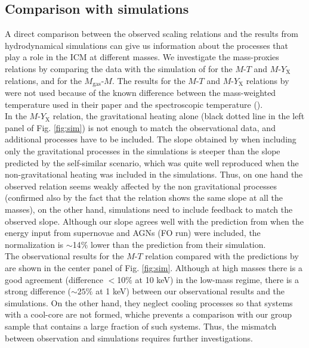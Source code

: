 \documentclass{aa} %
\begin{document}
\subsection{Comparison with simulations}
A direct comparison between the observed scaling relations and the
results from hydrodynamical simulations can give us information about
the processes that play a role in the ICM at different
masses. We investigate the mass-proxies relations by comparing the
data with the simulation of \citet{2010MNRAS.408.2213S} for the
$M$-$T$ and $M$-$Y_{\text{X}}$ relations, and
\cite{2011MNRAS.416..801F} for the $M_{\text{gas}}$-$M$. The results for
the $M$-$T$ and $M$-$Y_{\text{X}}$ relations by
\cite{2011MNRAS.416..801F} were not used because of the known
difference between the
mass-weighted temperature used in their paper and the spectroscopic temperature (\citealt{2004MNRAS.354...10M}). \\
In the $M$-$Y_{\text{X}}$ relation, the gravitational
heating alone (black dotted line in the left panel of Fig. \ref{fig:sim}) is not enough to match the observational data, and
additional processes have to be included. The slope obtained by
\citet{2010MNRAS.408.2213S} when including only the
gravitational processes in the simulations is steeper than the slope predicted by the
self-similar scenario, which was quite well reproduced when the
non-gravitational heating was included in the simulations. Thus, on
one hand the observed relation seems weakly affected by the non
gravitational processes (confirmed also by the fact that the relation
shows the same slope at all the masses), on the other hand, simulations
need to include feedback to match the observed slope. Although our slope agrees well  with the prediction from
\citet{2010MNRAS.408.2213S} when the energy input from supernovae and AGNs
(FO run) were included, the normalization is $\sim$14$\%$ lower than
the
prediction from their simulation.\\
The observational results for the $M$-$T$ relation compared with the
predictions by \citet{2010MNRAS.408.2213S} are shown in the center panel
of Fig. \ref{fig:sim}. Although at high masses there is a good
agreement (difference $<$10$\%$ at 10 keV) in the low-mass regime, there is a strong difference ($\sim25\%$ at 1 keV) between
our observational results and the simulations. On the other hand, they neglect cooling processes
so that systems with a cool-core are not formed, whiche prevents a comparison with our group sample that contains a large fraction of such
systems. Thus, the mismatch
between observation and simulations requires further investigations.\\
\end{document}

